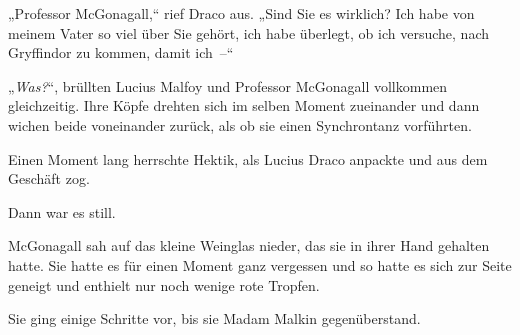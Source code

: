 „Professor McGonagall,“ rief Draco aus. „Sind Sie es wirklich? Ich habe von meinem Vater so viel über Sie gehört, ich habe überlegt, ob ich versuche, nach Gryffindor zu kommen, damit ich –“

„\emph{Was?}“, brüllten Lucius Malfoy und Professor McGonagall vollkommen gleichzeitig. Ihre Köpfe drehten sich im selben Moment zueinander und dann wichen beide voneinander zurück, als ob sie einen Synchrontanz vorführten.

Einen Moment lang herrschte Hektik, als Lucius Draco anpackte und aus dem Geschäft zog.

Dann war es still.

McGonagall sah auf das kleine Weinglas nieder, das sie in ihrer Hand gehalten hatte. Sie hatte es für einen Moment ganz vergessen und so hatte es sich zur Seite geneigt und enthielt nur noch wenige rote Tropfen.

Sie ging einige Schritte vor, bis sie Madam Malkin gegenüberstand.

